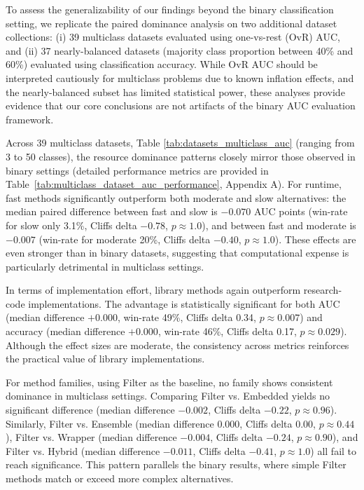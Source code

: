 \documentclass[preprint,12pt,authoryear]{elsarticle}
\begin{document}
{To assess the generalizability of our findings beyond the binary classification setting, we replicate the paired dominance analysis on two additional dataset collections: (i) 39 multiclass datasets evaluated using one-vs-rest (OvR) AUC, and (ii) 37 nearly-balanced datasets (majority class proportion between 40\% and 60\%) evaluated using classification accuracy. While OvR AUC should be interpreted cautiously for multiclass problems due to known inflation effects, and the nearly-balanced subset has limited statistical power, these analyses provide evidence that our core conclusions are not artifacts of the binary AUC evaluation framework.

Across 39 multiclass datasets, Table \ref{tab:datasets_multiclass_auc} (ranging from 3 to 50 classes), the resource dominance patterns closely mirror those observed in binary settings (detailed performance metrics are provided in Table~\ref{tab:multiclass_dataset_auc_performance}, Appendix A). For runtime, fast methods significantly outperform both moderate and slow alternatives: the median paired difference between fast and slow is $-0.070$ AUC points (win-rate for slow only 3.1\%, Cliffs delta $-0.78$, $p \approx 1.0$), and between fast and moderate is $-0.007$ (win-rate for moderate 20\%, Cliffs delta $-0.40$, $p \approx 1.0$). These effects are even stronger than in binary datasets, suggesting that computational expense is particularly detrimental in multiclass settings.

In terms of implementation effort, library methods again outperform research-code implementations. The advantage is statistically significant for both AUC (median difference $+0.000$, win-rate 49\%, Cliffs delta 0.34, $p \approx 0.007$) and accuracy (median difference $+0.000$, win-rate 46\%, Cliffs delta 0.17, $p \approx 0.029$). Although the effect sizes are moderate, the consistency across metrics reinforces the practical value of library implementations.

For method families, using Filter as the baseline, no family shows consistent dominance in multiclass settings. Comparing Filter vs. Embedded yields no significant difference (median difference $-0.002$, Cliffs delta $-0.22$, $p \approx 0.96$). Similarly, Filter vs. Ensemble (median difference $0.000$, Cliffs delta $0.00$, $p \approx 0.44$), Filter vs. Wrapper (median difference $-0.004$, Cliffs delta $-0.24$, $p \approx 0.90$), and Filter vs. Hybrid (median difference $-0.011$, Cliffs delta $-0.41$, $p \approx 1.0$) all fail to reach significance. This pattern parallels the binary results, where simple Filter methods match or exceed more complex alternatives.

}
\end{document}
